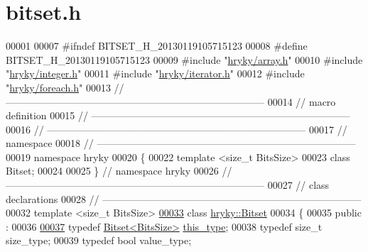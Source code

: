 \hypertarget{bitset_8h_source}{\section{bitset.\-h}
}

\begin{DoxyCode}
00001 
00007 \textcolor{preprocessor}{#ifndef BITSET\_H\_20130119105715123}
00008 \textcolor{preprocessor}{}\textcolor{preprocessor}{#define BITSET\_H\_20130119105715123}
00009 \textcolor{preprocessor}{}\textcolor{preprocessor}{#include "\hyperlink{array_8h}{hryky/array.h}"}
00010 \textcolor{preprocessor}{#include "\hyperlink{integer_8h}{hryky/integer.h}"}
00011 \textcolor{preprocessor}{#include "\hyperlink{iterator_8h}{hryky/iterator.h}"}
00012 \textcolor{preprocessor}{#include "\hyperlink{foreach_8h}{hryky/foreach.h}"}
00013 \textcolor{comment}{//
      ------------------------------------------------------------------------------}
00014 \textcolor{comment}{// macro definition}
00015 \textcolor{comment}{//
      ------------------------------------------------------------------------------}
00016 \textcolor{comment}{//
      ------------------------------------------------------------------------------}
00017 \textcolor{comment}{// namespace}
00018 \textcolor{comment}{//
      ------------------------------------------------------------------------------}
00019 \textcolor{keyword}{namespace }hryky
00020 \{
00022     \textcolor{keyword}{template} <\textcolor{keywordtype}{size\_t} BitsSize>
00023     \textcolor{keyword}{class }Bitset;
00024 
00025 \} \textcolor{comment}{// namespace hryky}
00026 \textcolor{comment}{//
      ------------------------------------------------------------------------------}
00027 \textcolor{comment}{// class declarations}
00028 \textcolor{comment}{//
      ------------------------------------------------------------------------------}
00032 \textcolor{comment}{}\textcolor{keyword}{template} <\textcolor{keywordtype}{size\_t} BitsSize>
\hypertarget{bitset_8h_source_l00033}{}\hyperlink{classhryky_1_1_bitset}{00033} \textcolor{keyword}{class }\hyperlink{classhryky_1_1_bitset}{hryky::Bitset}
00034 \{
00035 \textcolor{keyword}{public} :
00036 
\hypertarget{bitset_8h_source_l00037}{}\hyperlink{classhryky_1_1_bitset_a967bec88789e12e2ca96e7a73907822c}{00037}     \textcolor{keyword}{typedef} \hyperlink{classhryky_1_1_bitset}{Bitset<BitsSize>} \hyperlink{classhryky_1_1_bitset_a967bec88789e12e2ca96e7a73907822c}{this_type};
00038     \textcolor{keyword}{typedef} \textcolor{keywordtype}{size\_t} size\_type;
00039     \textcolor{keyword}{typedef} \textcolor{keywordtype}{bool} value\_type;

\end{DoxyCode}
